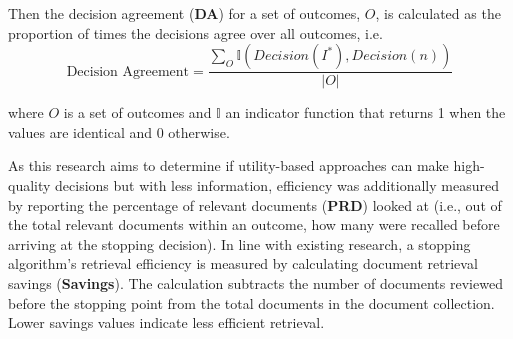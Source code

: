 \documentclass[sigconf,natbib=true,anonymous=true]{acmart}
\begin{document}

Then the decision agreement ({\bf DA}) for a set of outcomes, $O$, is calculated as the proportion of times the decisions agree over all outcomes, i.e. 
\begin{equation}
\label{DA}
\text{Decision Agreement} = \frac{\sum_{O} \mathbb{I}(Decision(I^{*}), Decision(n))}{|O|}
\end{equation}

where $O$ is a set of outcomes and $\mathbb{I}$ an indicator function that returns 1 when the values are identical and 0 otherwise. 




As this research aims to determine if utility-based approaches can make high-quality decisions but with less information, efficiency was additionally measured by reporting the percentage of relevant documents ({\bf PRD}) looked at (i.e., out of the total relevant documents within an outcome, how many were recalled before arriving at the stopping decision). 
In line with existing research, a stopping algorithm's retrieval efficiency is measured by calculating document retrieval savings ({\bf Savings}). The calculation subtracts the number of documents reviewed before the stopping point from the total documents in the document collection. Lower savings values indicate less efficient retrieval. 
\end{document}
